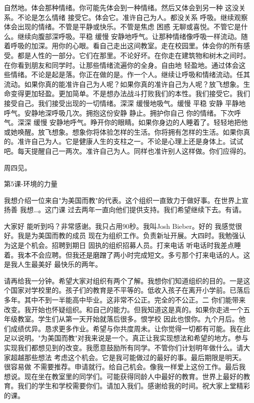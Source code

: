 自然地。体会那种情绪。你可能先体会到一种情绪。然后又体会到另一种 这没关系。不论是怎么情绪 接受它。体会它。准许自己为人。都没关系 呼吸。继续观察体会出现的情绪。不管是平静或快乐。不管是焦虑 困惑 无聊或喜悦。不管它是什么。继续向腹部深呼吸。平稳 缓慢 安静地呼气。让那种情绪像呼吸一样流动。随着呼吸的加深。用你的心眼。看自己走出这间教室。走在校园里。体会你的所有感受。都是人性的一部分。它们在那里。不论好坏。在你走在建筑物和树木之间时。在你看到朋友和同学时。让那些情绪流遍你的全身。自由地 轻盈地。通过体会这些情绪。不论是起是落。你正在做的是。作一个人。继续让呼吸和情绪流动。任其流动。如果你真的能准许自己为人呢？如果你真的准许自己为人呢？放飞想象。生命变得更加轻盈。更加简单。不是想办法战斗打败我们的本性。我们接受它。我们接受自己。我们接受出现的一切情绪。深深 缓慢地吸气。缓慢 平稳 安静 平静地呼气。安静地深呼吸几次。拥抱这份安静 静止。拥护你自己 你的情绪。下次呼气。深深 缓慢 安静地呼气。睁开你的眼睛。如果你身边的人睡着了。轻轻地把他或她唤醒。放飞想象。想象你将体验怎样的生活。你将拥有怎样的生活。如果你真的。准许自己为人。它是健康人生的支柱之一。不论是心理上还是身体上。试试吧。每天提醒自己一两次。准许自己为人。同样也准许别人这样做。你们应得的。 

周四见。 

第5课-环境的力量 

我想介绍一位来自"为美国而教"的代表。这个组织一直致力于做好事。在世界上宣扬善 我想…。这门课 过去两年一直向他们提供支持。我们希望继续下去。有请。 

大家好 能听到吗？非常感谢。我只占用90秒。我叫Josh Bieber。好的 我感觉很好。我是为美国而教的成员 现在为组织工作。负责新址开展。大四时。我勉强认为这是个机会。招聘到期日 固执的组织招募人员。打来电话 听电话时我差点睡着。我本不会应聘。但我还是磨蹭了两小时完成短文。多亏那个打来电话的人。这是我人生最美好 最快乐的两年。 

请再给我一分钟。希望大家对组织有两个了解。我想你们知道组织的目的。一是这个国家对学校里的。孩子们的教育是不平等的。低收入孩子在离开小学前。已落后多年。其中不到一半能高中毕业。这非常不公正。完全的不公正。二 你们能带来改变。我开始也怀疑组织。和自己的能力。但我知道这是真的。如果你走进一个五年级教室。学生们从第一天开始就落后很多。恨学校 因此也恨你。九个月后。他们成绩优异。恳求更多作业。希望与你共度周未。让你觉得一切都有可能。我在此足以说明。"为美国而教"对我来说是一个。真正让我实现想法和希望的地方。参与实现我们都想见到的改变。我愿意鼓励所有同学。不管你们计划明年做什么。请大家超越那些想法 考虑这个机会。它是我可能做过的最好的事。最后期限是明天。很容易做 不需要推荐。申请就行。给自己机会。像我一样爱上这份工作。最后我想说。现在坐在教室里的同学们。可能获得同龄人中最好的教育。世界上最好的教育。我们的学生和学校需要你们。请加入我们。感谢给我的时间。祝大家上堂精彩的课。 

